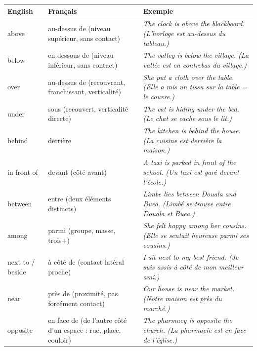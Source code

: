 \documentclass[11pt]{article}
\newcommand{\eng}[1]{\ifmmode\text{\textit{#1}}\else\begingroup\selectlanguage{english}\itshape #1\endgroup\fi}
\begin{document}
\begin{center}
\begin{tabularx}{\linewidth}{|X|X|X|}
\hline
\rowcolor{popblueL} English & Français & Exemple \\
\hline
above & au-dessus de (niveau supérieur, sans contact) & \eng{The clock is above the blackboard.} (L'horloge est au-dessus du tableau.) \\
\hline
below & en dessous de (niveau inférieur, sans contact) & \eng{The valley is below the village.} (La vallée est en contrebas du village.) \\
\hline
over & au-dessus de (recouvrant, franchissant, verticalité) & \eng{She put a cloth over the table.} (Elle a mis un tissu \emph{sur} la table = le couvre.) \\
\hline
under & sous (recouvert, verticalité directe) & \eng{The cat is hiding under the bed.} (Le chat se cache sous le lit.) \\
\hline
behind & derrière & \eng{The kitchen is behind the house.} (La cuisine est derrière la maison.) \\
\hline
in front of & devant (côté avant) & \eng{A taxi is parked in front of the school.} (Un taxi est garé devant l'école.) \\
\hline
between & entre (deux éléments distincts) & \eng{Limbe lies between Douala and Buea.} (Limbé se trouve entre Douala et Buea.) \\
\hline
among & parmi (groupe, masse, trois+) & \eng{She felt happy among her cousins.} (Elle se sentait heureuse parmi ses cousins.) \\
\hline
next to / beside & à côté de (contact latéral proche) & \eng{I sit next to my best friend.} (Je suis assis à côté de mon meilleur ami.) \\
\hline
near & près de (proximité, pas forcément contact) & \eng{Our house is near the market.} (Notre maison est près du marché.) \\
\hline
opposite & en face de (de l'autre côté d'un espace : rue, place, couloir) & \eng{The pharmacy is opposite the church.} (La pharmacie est en face de l'église.) \\
\hline
\end{tabularx}
\end{center}
\end{document}
